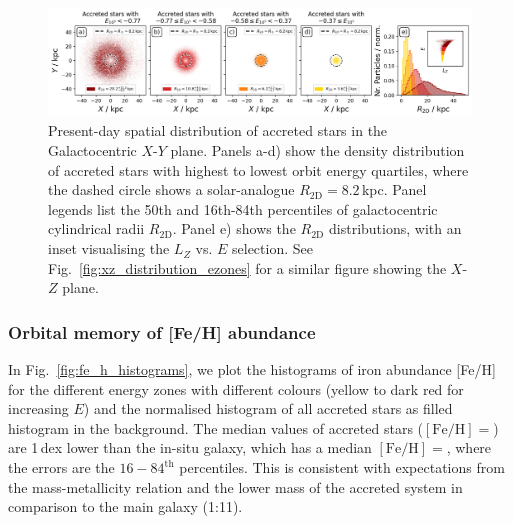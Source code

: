 \documentclass[fleqn,usenatbib]{mnras}
\begin{document}
\begin{figure}
    \centering
    \includegraphics[width=\textwidth]{figures/xy_distribution_ezones.png}
    \caption{Present-day spatial distribution of accreted stars in the Galactocentric $X$-$Y$ plane. Panels a-d) show the density distribution of accreted stars with highest to lowest orbit energy quartiles, where the dashed circle shows a solar-analogue $R_\mathrm{2D}=8.2$\,kpc. Panel legends list the 50th and 16th-84th percentiles of galactocentric cylindrical radii $R_\mathrm{2D}$. Panel e) shows the $R_\mathrm{2D}$ distributions, with an inset visualising the $L_Z$ vs. $E$ selection. See Fig.~\ref{fig:xz_distribution_ezones} for a similar figure showing the $X$-$Z$ plane.}
    \label{fig:xy_distribution_ezones}
\end{figure}

\subsubsection{Orbital memory of {[Fe/H]} abundance}

In Fig.~\ref{fig:fe_h_histograms}, we plot the histograms of iron abundance [Fe/H] for the different energy zones with different colours (yellow to dark red for increasing $E$) and the normalised histogram of all accreted stars as filled histogram in the background. The median values of accreted stars ($\mathrm{[Fe/H]} = $) are 1\,dex lower than the in-situ galaxy, which has a median $\mathrm{[Fe/H]} = $, where the errors are the $16-84^\mathrm{th}$ percentiles. This is consistent with expectations from the mass-metallicity relation \citep[for example][]{Gallazzi2005, Kirby2013} and the lower mass of the accreted system in comparison to the main galaxy (1:11).
\end{document}
